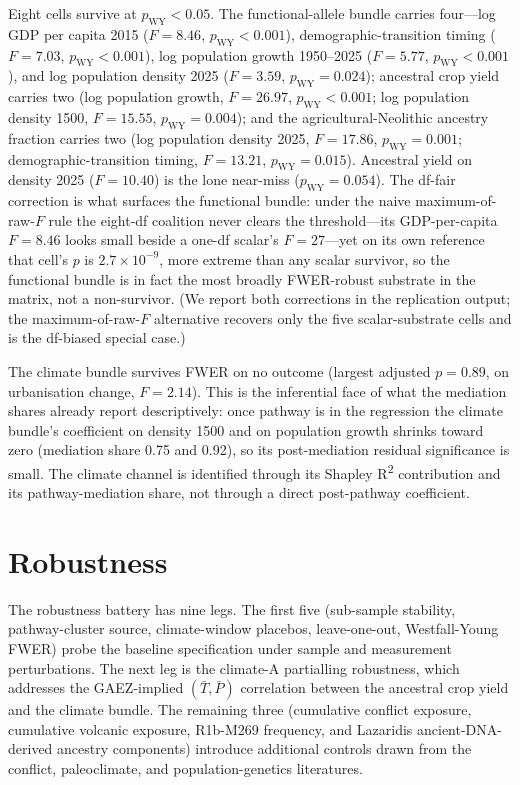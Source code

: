 \documentclass[11pt,letterpaper]{article}
\begin{document}
Eight cells survive at $p_{\text{WY}}<0.05$. The functional-allele bundle carries four---log GDP per capita 2015 ($F=8.46$, $p_{\text{WY}}<0.001$), demographic-transition timing ($F=7.03$, $p_{\text{WY}}<0.001$), log population growth 1950--2025 ($F=5.77$, $p_{\text{WY}}<0.001$), and log population density 2025 ($F=3.59$, $p_{\text{WY}}=0.024$); ancestral crop yield carries two (log population growth, $F=26.97$, $p_{\text{WY}}<0.001$; log population density 1500, $F=15.55$, $p_{\text{WY}}=0.004$); and the agricultural-Neolithic ancestry fraction carries two (log population density 2025, $F=17.86$, $p_{\text{WY}}=0.001$; demographic-transition timing, $F=13.21$, $p_{\text{WY}}=0.015$). Ancestral yield on density 2025 ($F=10.40$) is the lone near-miss ($p_{\text{WY}}=0.054$). The df-fair correction is what surfaces the functional bundle: under the naive maximum-of-raw-$F$ rule the eight-df coalition never clears the threshold---its GDP-per-capita $F=8.46$ looks small beside a one-df scalar's $F=27$---yet on its own reference that cell's $p$ is $2.7\times10^{-9}$, more extreme than any scalar survivor, so the functional bundle is in fact the most broadly FWER-robust substrate in the matrix, not a non-survivor. (We report both corrections in the replication output; the maximum-of-raw-$F$ alternative recovers only the five scalar-substrate cells and is the df-biased special case.)

The climate bundle survives FWER on no outcome (largest adjusted $p=0.89$, on urbanisation change, $F=2.14$). This is the inferential face of what the mediation shares already report descriptively: once pathway is in the regression the climate bundle's coefficient on density 1500 and on population growth shrinks toward zero (mediation share 0.75 and 0.92), so its post-mediation residual significance is small. The climate channel is identified through its Shapley R\textsuperscript{2} contribution and its pathway-mediation share, not through a direct post-pathway coefficient.

\section{Robustness}
\label{sec:robustness}

The robustness battery has nine legs. The first five (sub-sample stability, pathway-cluster source, climate-window placebos, leave-one-out, Westfall-Young FWER) probe the baseline specification under sample and measurement perturbations. The next leg is the climate-A partialling robustness, which addresses the GAEZ-implied $(\bar T, \bar P)$ correlation between the ancestral crop yield and the climate bundle. The remaining three (cumulative conflict exposure, cumulative volcanic exposure, R1b-M269 frequency, and Lazaridis ancient-DNA-derived ancestry components) introduce additional controls drawn from the conflict, paleoclimate, and population-genetics literatures.
\end{document}
